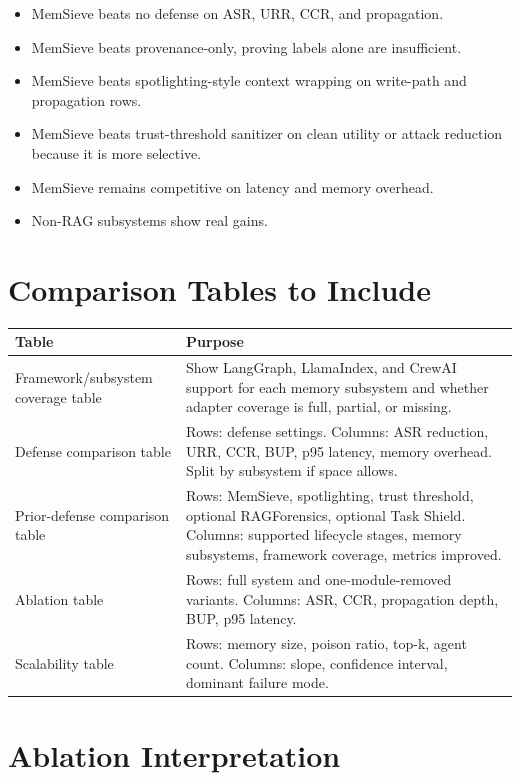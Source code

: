 \documentclass[11pt,oneside]{report}
\newcommand{\project}{MemSieve}
\begin{document}
\begin{itemize}
  \item \project{} beats no defense on ASR, URR, CCR, and propagation.
  \item \project{} beats provenance-only, proving labels alone are insufficient.
  \item \project{} beats spotlighting-style context wrapping on write-path and propagation rows.
  \item \project{} beats trust-threshold sanitizer on clean utility or attack reduction because it is
        more selective.
  \item \project{} remains competitive on latency and memory overhead.
  \item Non-RAG subsystems show real gains.
\end{itemize}

\section{Comparison Tables to Include}

\begin{longtable}{|L{0.20\textwidth}|L{0.70\textwidth}|}
\hline
\textbf{Table} & \textbf{Purpose} \\
\hline
Framework/subsystem coverage table & Show LangGraph, LlamaIndex, and CrewAI support for each memory
subsystem and whether adapter coverage is full, partial, or missing. \\
\hline
Defense comparison table & Rows: defense settings. Columns: ASR reduction, URR, CCR, BUP, p95
latency, memory overhead. Split by subsystem if space allows. \\
\hline
Prior-defense comparison table & Rows: \project{}, spotlighting, trust threshold, optional
RAGForensics, optional Task Shield. Columns: supported lifecycle stages, memory subsystems, framework
coverage, metrics improved. \\
\hline
Ablation table & Rows: full system and one-module-removed variants. Columns: ASR, CCR, propagation
depth, BUP, p95 latency. \\
\hline
Scalability table & Rows: memory size, poison ratio, top-k, agent count. Columns: slope, confidence
interval, dominant failure mode. \\
\hline
\end{longtable}

\section{Ablation Interpretation}
\end{document}
